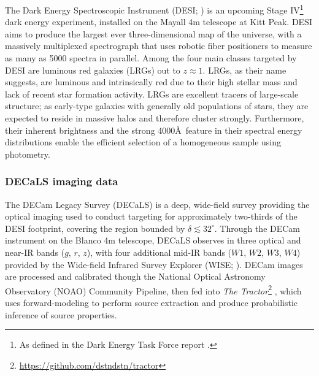 \documentclass[a4paper,usenatbib]{mnras}
\begin{document}
The Dark Energy Spectroscopic Instrument (DESI; \citealt{DESI16}) is an upcoming Stage IV\footnote{As defined in the Dark Energy Task Force report \citep{DarkEnergyTaskForce}.} dark energy experiment, installed on the Mayall 4m telescope at Kitt Peak. DESI aims to produce the largest ever three-dimensional map of the universe, with a massively multiplexed spectrograph that uses robotic fiber positioners to measure as many as 5000 spectra in parallel. Among the four main classes targeted by DESI are luminous red galaxies (LRGs) out to $z \approx 1$. LRGs, as their name suggests, are luminous and intrinsically red due to their high stellar mass and lack of recent star formation activity. LRGs are excellent tracers of large-scale structure; as early-type galaxies with generally old populations of stars, they are expected to reside in massive halos and therefore cluster strongly. Furthermore, their inherent brightness and the strong 4000\AA \ feature in their spectral energy distributions enable the efficient selection of a homogeneous sample using photometry.

\subsubsection{DECaLS imaging data}


The DECam Legacy Survey (DECaLS) is a deep, wide-field survey providing the optical imaging used to conduct targeting for approximately two-thirds of the DESI footprint, covering the region bounded by $\delta \lesssim 32^{\circ}$. Through the DECam instrument \citep{Flaugher15} on the Blanco 4m telescope, DECaLS observes in three optical and near-IR bands ($g$, $r$, $z$), with four additional mid-IR bands ($W1$, $W2$, $W3$, $W4$) provided by the Wide-field Infrared Survey Explorer (WISE; \citealt{Wright10}). DECam images are processed and calibrated though the National Optical Astronomy
Observatory (NOAO) Community Pipeline, then fed into \textit{The Tractor}\footnote{\url{https://github.com/dstndstn/tractor}} \citep{Lang16a}, which uses forward-modeling to perform source extraction and produce probabilistic inference of source properties.


\end{document}
